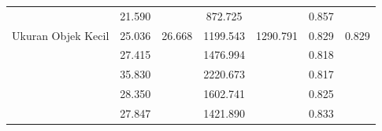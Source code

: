 \begin{table}[]
\begin{tabular}{|l|cc|cc|cc|}
                                                      & \multicolumn{1}{c|}{\cellcolor[HTML]{FFFFFF}21.590} & \cellcolor[HTML]{FFFFFF}                         & \multicolumn{1}{c|}{\cellcolor[HTML]{FFFFFF}872.725}  & \cellcolor[HTML]{FFFFFF}                           & \multicolumn{1}{c|}{\cellcolor[HTML]{FFFFFF}0.857} & \cellcolor[HTML]{FFFFFF}                        \\ \cline{2-2} \cline{4-4} \cline{6-6}
  \multirow{-5}{*}{Ukuran Objek Kecil}                & \multicolumn{1}{c|}{\cellcolor[HTML]{FFFFFF}25.036} & \multirow{-5}{*}{\cellcolor[HTML]{FFFFFF}26.668} & \multicolumn{1}{c|}{\cellcolor[HTML]{FFFFFF}1199.543} & \multirow{-5}{*}{\cellcolor[HTML]{FFFFFF}1290.791} & \multicolumn{1}{c|}{\cellcolor[HTML]{FFFFFF}0.829} & \multirow{-5}{*}{\cellcolor[HTML]{FFFFFF}0.829} \\ \hline
                                                      & \multicolumn{1}{c|}{\cellcolor[HTML]{FFFFFF}27.415} & \cellcolor[HTML]{FFFFFF}                         & \multicolumn{1}{c|}{\cellcolor[HTML]{FFFFFF}1476.994} & \cellcolor[HTML]{FFFFFF}                           & \multicolumn{1}{c|}{\cellcolor[HTML]{FFFFFF}0.818} & \cellcolor[HTML]{FFFFFF}                        \\ \cline{2-2} \cline{4-4} \cline{6-6}
                                                      & \multicolumn{1}{c|}{\cellcolor[HTML]{FFFFFF}35.830} & \cellcolor[HTML]{FFFFFF}                         & \multicolumn{1}{c|}{\cellcolor[HTML]{FFFFFF}2220.673} & \cellcolor[HTML]{FFFFFF}                           & \multicolumn{1}{c|}{\cellcolor[HTML]{FFFFFF}0.817} & \cellcolor[HTML]{FFFFFF}                        \\ \cline{2-2} \cline{4-4} \cline{6-6}
                                                      & \multicolumn{1}{c|}{\cellcolor[HTML]{FFFFFF}28.350} & \cellcolor[HTML]{FFFFFF}                         & \multicolumn{1}{c|}{\cellcolor[HTML]{FFFFFF}1602.741} & \cellcolor[HTML]{FFFFFF}                           & \multicolumn{1}{c|}{\cellcolor[HTML]{FFFFFF}0.825} & \cellcolor[HTML]{FFFFFF}                        \\ \cline{2-2} \cline{4-4} \cline{6-6}
                                                      & \multicolumn{1}{c|}{\cellcolor[HTML]{FFFFFF}27.847} & \cellcolor[HTML]{FFFFFF}                         & \multicolumn{1}{c|}{\cellcolor[HTML]{FFFFFF}1421.890} & \cellcolor[HTML]{FFFFFF}                           & \multicolumn{1}{c|}{\cellcolor[HTML]{FFFFFF}0.833} & \cellcolor[HTML]{FFFFFF}                        \\ \cline{2-2} \cline{4-4} \cline{6-6}

\end{tabular}
\end{table}
